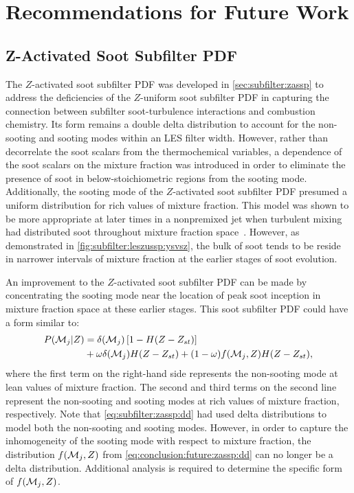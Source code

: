 \section{Recommendations for Future Work}
\label{sec:conclusion:future}

\subsection{Z-Activated Soot Subfilter PDF}
\label{sec:conclusion:future:zassp}

The $Z$-activated soot subfilter PDF was developed in \cref{sec:subfilter:zassp} to address the deficiencies of the $Z$-uniform soot subfilter PDF in capturing the connection between subfilter soot-turbulence interactions and combustion chemistry. Its form remains a double delta distribution to account for the non-sooting and sooting modes within an LES filter width. However, rather than decorrelate the soot scalars from the thermochemical variables, a dependence of the soot scalars on the mixture fraction was introduced in order to eliminate the presence of soot in below-stoichiometric regions from the sooting mode. Additionally, the sooting mode of the $Z$-activated soot subfilter PDF presumed a uniform distribution for rich values of mixture fraction. This model was shown to be more appropriate at later times in a nonpremixed jet when turbulent mixing had distributed soot throughout mixture fraction space~\cite{attili2014}. However, as demonstrated in \cref{fig:subfilter:leszussp:ysvsz}, the bulk of soot tends to be reside in narrower intervals of mixture fraction at the earlier stages of soot evolution.

An improvement to the $Z$-activated soot subfilter PDF can be made by concentrating the sooting mode near the location of peak soot inception in mixture fraction space at these earlier stages. This soot subfilter PDF could have a form similar to:
\begin{equation}\label{eq:conclusion:future:zassp:dd}
  \begin{split}
    P(\mathcal{M}_j|Z) &= \delta(\mathcal{M}_j)\left[ 1 - H(Z - Z_{st}) \right] \\
    &+ \omega\delta(\mathcal{M}_j)H(Z - Z_{st}) + (1 - \omega)f(\mathcal{M}_j, Z)H(Z - Z_{st}),
  \end{split}
\end{equation}
where the first term on the right-hand side represents the non-sooting mode at lean values of mixture fraction. The second and third terms on the second line represent the non-sooting and sooting modes at rich values of mixture fraction, respectively. Note that \cref{eq:subfilter:zassp:dd} had used delta distributions to model both the non-sooting and sooting modes. However, in order to capture the inhomogeneity of the sooting mode with respect to mixture fraction, the distribution $f(\mathcal{M}_j, Z)$ from \cref{eq:conclusion:future:zassp:dd} can no longer be a delta distribution. Additional analysis is required to determine the specific form of $f(\mathcal{M}_j, Z)$.

